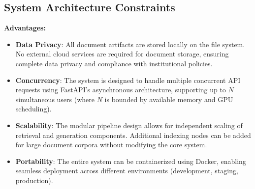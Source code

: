 \subsection{System Architecture Constraints}

\textbf{Advantages:}
\begin{itemize}
    \item \textbf{Data Privacy}: All document artifacts are stored locally on the file system. No external cloud services are required for document storage, ensuring complete data privacy and compliance with institutional policies.
    \item \textbf{Concurrency}: The system is designed to handle multiple concurrent API requests using FastAPI's asynchronous architecture, supporting up to $N$ simultaneous users (where $N$ is bounded by available memory and GPU scheduling).
    \item \textbf{Scalability}: The modular pipeline design allows for independent scaling of retrieval and generation components. Additional indexing nodes can be added for large document corpora without modifying the core system.
    \item \textbf{Portability}: The entire system can be containerized using Docker, enabling seamless deployment across different environments (development, staging, production).
\end{itemize}

